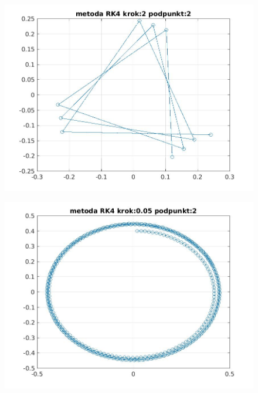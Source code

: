 \documentclass[a4paper, 11pt]{article}
\begin{document}
\begin{figure}[htp]
\centering
\includegraphics[width = 15cm]{2d/metoda RK4 krok:2 podpunkt:2.jpg}
\end{figure}

\begin{figure}[htp]
\centering
\includegraphics[width = 15cm]{2d/metoda RK4 krok:0,05 podpunkt:2.jpg}
\end{figure}
\end{document}

